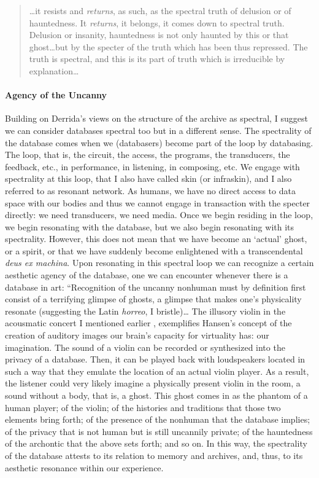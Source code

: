 \begin{quote}
	\dots it resists and \textit{returns}, as such, as the spectral truth of delusion or of hauntedness. It \textit{returns}, it belongs, it comes down to spectral truth. Delusion or insanity, hauntedness is not only haunted by this or that ghost\dots but by the specter of the truth which has been thus repressed. The truth is spectral, and this is its part of truth which is irreducible by explanation\dots \parencite[54-56]{Der95:Arc}
\end{quote} %

\paragraph{Agency of the Uncanny}
Building on Derrida's views on the structure of the archive as spectral, I suggest we can consider databases spectral too but in a different sense. The spectrality of the database comes when we (databasers) become part of the loop by databasing. The loop, that is, the circuit, the access, the programs, the transducers, the feedback, etc., in performance, in listening, in composing, etc. We engage with spectrality at this loop, that I also have called skin (or infraskin), and I also referred to as resonant network. As humans, we have no direct access to data space with our bodies and thus we cannot engage in transaction with the specter directly: we need transducers, we need media. Once we begin residing in the loop, we begin resonating with the database, but we also begin resonating with its spectrality. However, this does not mean that we have become an `actual' ghost, or a spirit, or that we have suddenly become enlightened with a transcendental \textit{deus ex machina}. Upon resonating in this spectral loop we can recognize a certain aesthetic agency of the database, one we can encounter whenever there is a database in art: ``Recognition of the uncanny nonhuman must by definition first consist of a terrifying glimpse of ghosts, a glimpse that makes one's physicality resonate (suggesting the Latin \textit{horreo}, I bristle)\dots  \parencite[169]{Mor13:Hyp} The illusory violin in the acousmatic concert I mentioned earlier , exemplifies Hansen's concept of the creation of auditory images our brain's capacity for virtuality has: our imagination. The sound of a violin can be recorded or synthesized into the privacy of a database. Then, it can be played back with loudspeakers located in such a way that they emulate the location of an actual violin player. As a result, the listener could very likely imagine a physically present violin in the room, a sound without a body, that is, a ghost. This ghost comes in as the phantom of a human player; of the violin; of the histories and traditions that those two elements bring forth; of the presence of the nonhuman that the database implies; of the privacy that is not human but is still uncannily private; of the hauntedness of the archontic that the above sets forth; and so on. In this way, the spectrality of the database attests to its relation to memory and archives, and, thus, to its aesthetic resonance within our experience.

